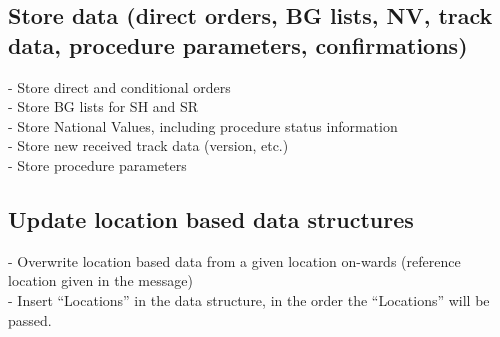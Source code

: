 \documentclass{template/openetcs_report}
\begin{document}
\subsection{Store data (direct orders, \gls{BG} lists, NV, track data, procedure parameters, confirmations)}
- Store direct and conditional orders\\
- Store \gls{BG} lists for SH and SR\\
- Store National Values, including procedure status information\\
- Store new received track data (version, etc.)\\
- Store procedure parameters\\

\subsection{Update location based data structures}
- Overwrite location based data from a given location on-wards (reference location given in the message)\\
- Insert “Locations” in the data structure, in the order the “Locations” will be passed.\\
\end{document}
